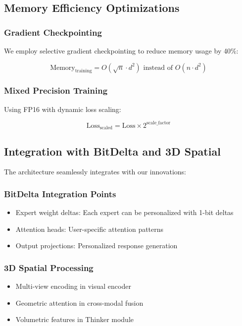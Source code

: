 \subsection{Memory Efficiency Optimizations}

\subsubsection{Gradient Checkpointing}
We employ selective gradient checkpointing to reduce memory usage by 40\%:

\begin{equation}
\text{Memory}_{\text{training}} = O(\sqrt{n} \cdot d^2) \text{ instead of } O(n \cdot d^2)
\end{equation}

\subsubsection{Mixed Precision Training}
Using FP16 with dynamic loss scaling:

\begin{equation}
\text{Loss}_{\text{scaled}} = \text{Loss} \times 2^{\text{scale\_factor}}
\end{equation}

\subsection{Integration with BitDelta and 3D Spatial}

The architecture seamlessly integrates with our innovations:

\subsubsection{BitDelta Integration Points}
\begin{itemize}
    \item Expert weight deltas: Each expert can be personalized with 1-bit deltas
    \item Attention heads: User-specific attention patterns
    \item Output projections: Personalized response generation
\end{itemize}

\subsubsection{3D Spatial Processing}
\begin{itemize}
    \item Multi-view encoding in visual encoder
    \item Geometric attention in cross-modal fusion
    \item Volumetric features in Thinker module
\end{itemize}

